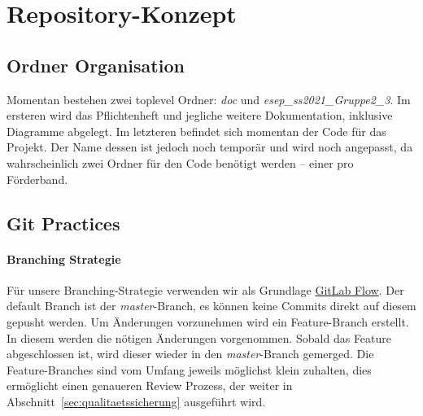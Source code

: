 \section{Repository-Konzept}\label{sec:repository-konzept}


\subsection{Ordner Organisation}\label{subsec:organisation}
Momentan bestehen zwei toplevel Ordner: \textit{doc} und \textit{esep\_ss2021\_Gruppe2\_3}.
Im ersteren wird das Pflichtenheft und jegliche weitere Dokumentation, inklusive Diagramme abgelegt.
Im letzteren befindet sich momentan der Code für das Projekt.
Der Name dessen ist jedoch noch temporär und wird noch angepasst,
da wahrscheinlich zwei Ordner für den Code benötigt werden -- einer pro Förderband.

\subsection{Git Practices}\label{subsec:git}

\paragraph{Branching Strategie}
Für unsere Branching-Strategie verwenden wir als Grundlage
\href{https://docs.gitlab.com/ee/topics/gitlab_flow.html}{GitLab Flow}.
Der default Branch ist der \textit{master}-Branch, es können keine Commits direkt auf diesem
gepusht werden.
Um Änderungen vorzunehmen wird ein Feature-Branch erstellt.
In diesem werden die nötigen Änderungen vorgenommen.
Sobald das Feature abgeschlossen ist, wird dieser wieder in den \textit{master}-Branch gemerged.
Die Feature-Branches sind vom Umfang jeweils möglichst klein zuhalten, dies ermöglicht einen
genaueren Review Prozess, der weiter in Abschnitt~\ref{sec:qualitaetssicherung} ausgeführt wird.

